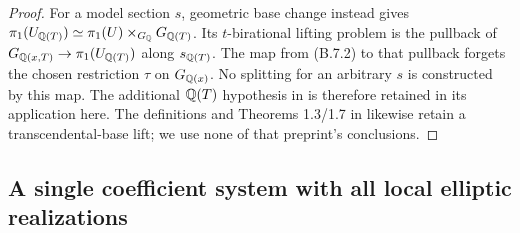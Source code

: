 \begin{proof}
For a model section $s$, geometric base change instead gives
$\pi_1(U_{\mathbb Q(T)})\simeq\pi_1(U)\times_{G_\mathbb Q}G_{\mathbb Q(T)}$.
Its $t$-birational lifting problem is the pullback of
$G_{\mathbb Q(x,T)}\to\pi_1(U_{\mathbb Q(T)})$ along $s_{\mathbb Q(T)}$.
The map from (B.7.2) to that pullback forgets the chosen restriction
$\tau$ on $G_{\mathbb Q(x)}$.  No splitting for an arbitrary $s$ is
constructed by this map.  The additional $\mathbb Q(T)$ hypothesis in
\cite[Theorem A]{BIR_Bresciani2024} is therefore retained in its
application here.  The definitions and Theorems 1.3/1.7 in
\cite{BIR_Pop2026} likewise retain a transcendental-base lift;
we use none of that preprint's conclusions.
\end{proof}

\subsection{A single coefficient system with all local elliptic realizations}

